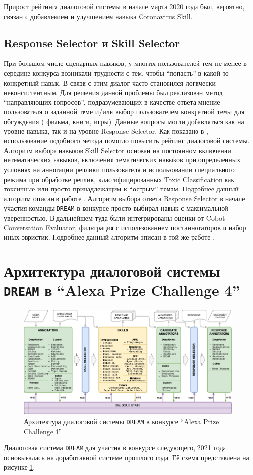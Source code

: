  Прирост рейтинга диалоговой системы в начале марта 2020 года был, вероятно, связан с добавлением и улучшением навыка Coronavirus Skill.

\subsection{Response Selector и Skill Selector}

При большом числе сценарных навыков, у многих пользователей тем не менее в середине конкурса возникали трудности с тем, чтобы “попасть” в какой-то конкретный навык. В связи с этим диалог часто становился логически неконсистентным. Для решения данной проблемы был реализован метод “направляющих вопросов”, подразумевающих в качестве ответа мнение пользователя о заданной теме и/или выбор пользователем конкретной темы для обсуждения ( фильма, книги, игры). Данные вопросы могли добавляться как на уровне навыка, так и на уровне Response Selector. Как показано в \cite{dream1}, использование подобного метода помогло повысить рейтинг диалоговой системы.
Алгоритм выбора навыков Skill Selector основан на постоянном включении нетематических навыков, включении тематических навыков при определенных условиях на аннотации реплики пользователя и использовании специального режима при обработке реплик, классифицированных Toxic Classification как токсичные или просто принадлежащим к “острым” темам. Подробнее данный алгоритм описан в работе \cite{dilya_thesis}.
Алгоритм выбора ответа Response Selector в начале участия команды \texttt{DREAM} в конкурсе просто выбирал навык с максимальной уверенностью. В дальнейшем туда были интегрированы оценки от Cobot Conversation Evaluator, фильтрация с использованием постаннотаторов и набор иных эвристик. Подробнее данный алгоритм описан в той же работе \cite{dilya_thesis}.

\section{Архитектура диалоговой системы \texttt{DREAM} в “Alexa Prize Challenge 4”}


\begin{figure}[ht]
  \includegraphics[width=\textwidth]{images/Alexa2_.png}
  \caption{Архитектура диалоговой системы \texttt{DREAM} в конкурсе “Alexa Prize Challenge 4”}\label{fig:Alexa2}
\end{figure}
Диалоговая система \texttt{DREAM} для участия в конкурсе следующего, 2021 года основывалась на доработанной системе прошлого года. Её схема представлена на рисунке \ref{fig:Alexa2}.


